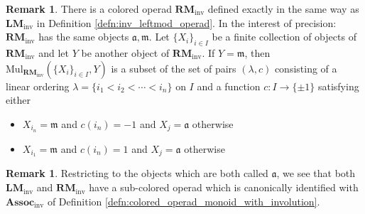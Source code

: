\documentclass{article}
\theoremstyle{definition}
\newtheorem{remark}[equation]{Remark}
\begin{document}
\begin{remark}
    There is a colored operad $ \mathbf{RM}_{\mathrm{inv}} $ defined exactly in the same way as $ \mathbf{LM}_{\mathrm{inv}} $ in Definition \ref{defn:inv_leftmod_operad}. 
    In the interest of precision: $ \mathbf{RM}_{\mathrm{inv}} $ has the same objects $ \mathfrak{a}, \mathfrak{m} $. 
    Let $ \{X_i\}_{i \in I} $ be a finite collection of objects of $ \mathbf{RM}_{\mathrm{inv}} $ and let $ Y $ be another object of $ \mathbf{RM}_{\mathrm{inv}} $. 
    If $ Y = \mathfrak{m} $, then $ \mathrm{Mul}_{\mathbf{RM}_\mathrm{inv}} \left(\{X_i\}_{i \in I}, Y\right) $ is a subset of the set of pairs $ (\lambda, c) $ consisting of a linear ordering $ \lambda = \{i_1 < i_2 < \cdots < i_n\} $ on $ I $ and a function $ c\colon I \to \{\pm 1 \} $ satisfying either 
    \begin{itemize}
        \item  $ X_{i_n} = \mathfrak{m} $ and $ c(i_n) = -1 $ and $ X_{j} = \mathfrak{a} $ otherwise
        \item  $ X_{i_1} = \mathfrak{m} $ and $ c(i_n) = 1 $ and $ X_{j} = \mathfrak{a} $ otherwise
    \end{itemize}
\end{remark}
\begin{remark} %
    Restricting to the objects which are both called $ \mathfrak{a} $, we see that both $ \mathbf{LM}_\mathrm{inv} $ and $ \mathbf{RM}_{\mathrm{inv}} $ have a sub-colored operad which is canonically identified with $ \mathbf{Assoc}_\mathrm{inv} $ of Definition \ref{defn:colored_operad_monoid_with_involution}. 
\end{remark}
\end{document}
